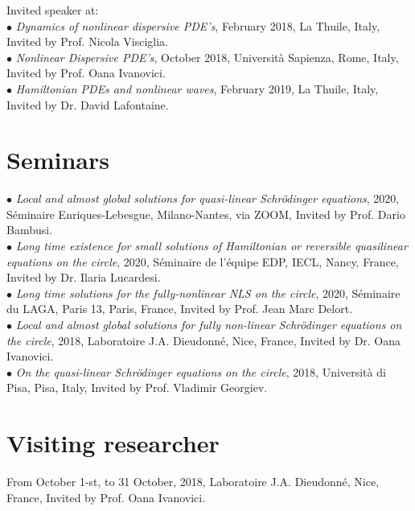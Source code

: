 \documentclass[margin,line,pifont,palatino,courier]{res}
\begin{document}
\begin{resume}
Invited speaker at:\\
 $\bullet$ \emph{Dynamics of nonlinear dispersive PDE's}, February 2018, La Thuile, Italy, Invited by Prof. Nicola Visciglia.\\
$\bullet$  \emph{Nonlinear Dispersive PDE's}, October 2018, Universit\`a Sapienza, Rome, Italy, Invited by Prof. Oana Ivanovici.\\
  $\bullet$ \emph{Hamiltonian PDEs and nonlinear waves}, February 2019, La Thuile, Italy, Invited by Dr. David Lafontaine.\\



\section{\sc Seminars}
$\bullet$ \emph{Local and almost global solutions for quasi-linear Schr\"odinger equations}, 2020, S\'eminaire Enriques-Lebesgue, Milano-Nantes, via ZOOM, Invited by Prof. Dario Bambusi. \\
$\bullet$ \emph{Long time existence for small solutions of Hamiltonian or reversible quasilinear equations on the circle}, 2020, S\'eminaire de l'\'equipe EDP, IECL, Nancy, France, Invited by Dr. Ilaria Lucardesi.\\
$\bullet$ \emph{Long time solutions for the fully-nonlinear NLS on the circle}, 2020, S\'eminaire du LAGA,  Paris 13, Paris, France, Invited by  Prof. Jean Marc Delort.\\
$\bullet$ \emph{Local and almost global solutions for fully non-linear Schr\"odinger equations on the circle}, 2018, Laboratoire  J.A. Dieudonn\'e, Nice, France,  Invited by Dr. Oana Ivanovici.\\
$\bullet$ \emph{On the quasi-linear Schr\"odinger equations on the circle}, 2018, Universit\`a di Pisa, Pisa, Italy,  Invited by Prof. Vladimir Georgiev.\\

\section{\sc Visiting researcher}

From October 1-st, to 31 October, 2018, Laboratoire  J.A. Dieudonn\'e, Nice, France,  Invited by Prof. Oana Ivanovici.


\end{resume}
\end{document}
